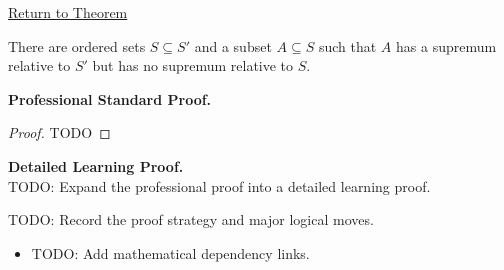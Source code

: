 \newpage
{}
\label{prf:ambient-existence-supremum}

\begin{remark*}[Return]
\hyperref[thm:ambient-existence-supremum]{Return to Theorem}
\end{remark*}

\begin{theorem*}
There are ordered sets $S\subseteq S'$ and a subset $A\subseteq S$ such that $A$ has a supremum relative to $S'$ but has no supremum relative to $S$.
\end{theorem*}

\textbf{Professional Standard Proof.}~\\
\begin{proof}
TODO
\end{proof}

\textbf{Detailed Learning Proof.}~\\
TODO: Expand the professional proof into a detailed learning proof.

\begin{remark*}
TODO: Record the proof strategy and major logical moves.
\end{remark*}

\begin{dependencies}
\begin{itemize}
  \item TODO: Add mathematical dependency links.
\end{itemize}
\end{dependencies}
